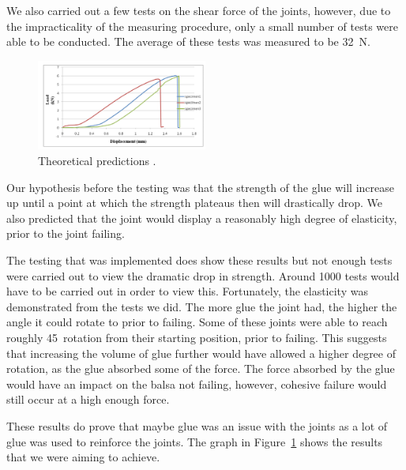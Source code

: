 \documentclass[12pt]{article}
\begin{document}
              
We also carried out a few tests on the shear force of the joints, however, due to the impracticality of the measuring procedure, only a small number of tests were able to be conducted. The average of these tests was measured to be 32~N.
                 \begin{figure}[h!]
                          \centering
                          \includegraphics[width=0.5\textwidth]{Articlegraph}
                          \caption{Theoretical predictions \citep{glue}.}
                          \label{graphg}
                 \end{figure}

Our hypothesis before the testing was that the strength of the glue will increase up until a point at which the strength plateaus then will drastically drop. We also predicted that the joint would display a reasonably high degree of elasticity, prior to the joint failing. 

The testing that was implemented does show these results but not enough tests were carried out to view the dramatic drop in strength. Around 1000 tests would have to be carried out in order to view this. 
Fortunately, the elasticity was demonstrated from the tests we did. The more glue the joint had, the higher the angle it could rotate to prior to failing. Some of these joints were able to reach roughly 45\textdegree~rotation from their starting position, prior to failing. This suggests that increasing the volume of glue further would have allowed a higher degree of rotation, as the glue absorbed some of the force. The force absorbed by the glue would have an impact on the balsa not failing, however, cohesive failure would still occur at a high enough force.

These results do prove that maybe glue was an issue with the joints as a lot of glue was used to reinforce the joints.
The graph in Figure~\ref{graphg} shows the results that we were aiming to achieve.
\end{document}

